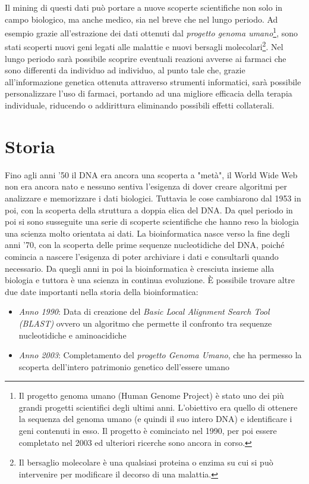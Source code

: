 Il mining di questi dati può portare a nuove scoperte scientifiche non solo in campo biologico, ma anche medico, sia nel breve che nel lungo periodo. Ad esempio grazie all'estrazione dei dati ottenuti dal \textit{progetto genoma umano}\footnote{Il progetto genoma umano (Human Genome Project) è stato uno dei più grandi progetti scientifici degli ultimi anni. L'obiettivo era quello di ottenere la sequenza del genoma umano (e quindi il suo intero DNA) e identificare i geni contenuti in esso. Il progetto è cominciato nel 1990, per poi essere completato nel 2003 ed ulteriori ricerche sono ancora in corso.}, sono stati scoperti nuovi geni legati alle malattie e nuovi bersagli molecolari\footnote{Il bersaglio molecolare è una qualsiasi proteina o enzima su cui si può intervenire per modificare il decorso di una malattia.}. Nel lungo periodo sarà possibile scoprire eventuali reazioni avverse ai farmaci che sono differenti da individuo ad individuo, al punto tale che, grazie all'informazione genetica ottenuta attraverso strumenti informatici, sarà possibile personalizzare l'uso di farmaci, portando ad una migliore efficacia della terapia individuale, riducendo o addirittura eliminando possibili effetti collaterali.


\section{Storia}
Fino agli anni '50 il DNA era ancora una scoperta a "metà", il World Wide Web non era ancora nato e nessuno sentiva l'esigenza di dover creare algoritmi per analizzare e memorizzare i dati biologici. Tuttavia le cose cambiarono dal 1953 in poi, con la scoperta della struttura a doppia elica del DNA. Da quel periodo in poi si sono susseguite una serie di scoperte scientifiche che hanno reso la biologia una scienza molto orientata ai dati.
\newline
La bioinformatica nasce verso la fine degli anni '70, con la scoperta delle prime sequenze nucleotidiche del DNA, poiché comincia a nascere l'esigenza di poter archiviare i dati e consultarli quando necessario. Da quegli anni in poi la bioinformatica è cresciuta insieme alla biologia e tuttora è una scienza in continua evoluzione.
\newline
\`E possibile trovare altre due date importanti nella storia della bioinformatica:
\begin{itemize}
	\item \textit{Anno 1990}: Data di creazione del \textit{Basic Local Alignment Search Tool (BLAST)}\cite{BLAST} ovvero un algoritmo che permette il confronto tra sequenze nucleotidiche e aminoacidiche
	\item \textit{Anno 2003}: Completamento del \textit{progetto Genoma Umano}, che ha permesso la scoperta dell'intero patrimonio genetico dell'essere umano
\end{itemize}


